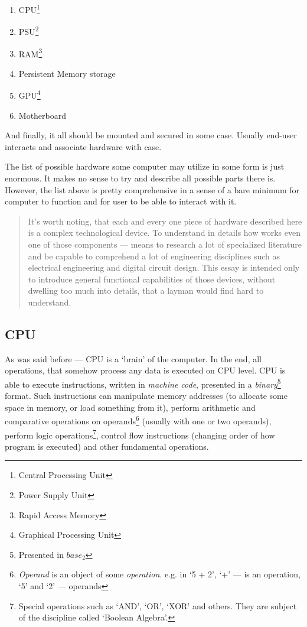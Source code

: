 \documentclass[../../what-is-computer.tex]{subfiles}
\begin{document}
        \begin{enumerate}
            \item CPU\footnote{Central Processing Unit}
            \item PSU\footnote{Power Supply Unit}
            \item RAM\footnote{Rapid Access Memory}
            \item Persistent Memory storage
            \item GPU\footnote{Graphical Processing Unit}
            \item Motherboard
        \end{enumerate}
        And finally, it all should be mounted and secured in some case. Usually end-user interacts and associate hardware with case. \par

        The list of possible hardware some computer may utilize in some form is just enormous. It makes no sense to try and describe all possible parts there is.
        However, the list above is pretty comprehensive in a sense of a bare minimum for computer to function and for user to be able to interact with it. \par

        \begin{quote}
            It's worth noting, that each and every one piece of hardware described here is a complex technological device. To understand in details how works even
            one of those components --- means to research a lot of specialized literature and be capable to comprehend a lot of engineering disciplines such as
            electrical engineering and digital circuit design. This essay is intended only to introduce general functional capabilities of those devices, without
            dwelling too much into details, that a layman would find hard to understand.
        \end{quote}

    \subsection{CPU}\label{subsection:cpu}

        As was said before --- CPU is a `brain' of the computer. In the end, all operations, that somehow process any data is executed on CPU level. CPU is able to
        execute instructions, written in \emph{machine code}, presented in a \emph{binary}\footnote{Presented in $base_2$} format. Such instructions can manipulate
        memory addresses (to allocate some space in memory, or load something from it), perform arithmetic and comparative operations on 
        operands\footnote{\emph{Operand} is an object of some \emph{operation}. e.g. in `5 + 2', `+' --- is an operation, `5' and `2' --- operands}
        (usually with one or two operands), perform logic operations\footnote{Special operations such as `AND', `OR', `XOR' and others. They are subject of the discipline called `Boolean Algebra'.}, control
        flow instructions (changing order of how program is executed) and other fundamental operations. \par
\end{document}
